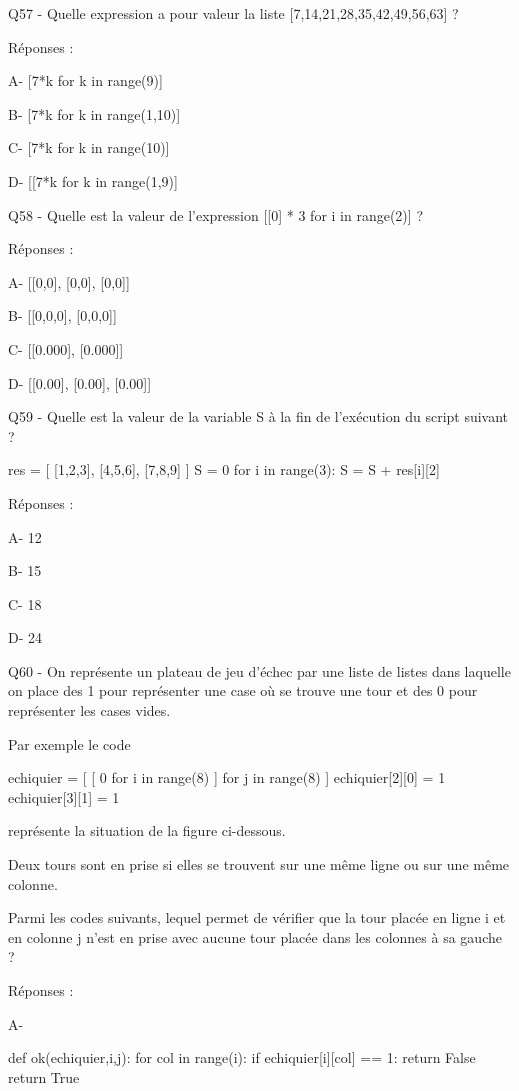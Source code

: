 \documentclass[
]{book}
\begin{document}
Q57 - Quelle expression a pour valeur la liste {[}7,14,21,28,35,42,49,56,63{]} ?

Réponses :

A- {[}7*k for k in range(9){]}

B- {[}7*k for k in range(1,10){]}

C- {[}7*k for k in range(10){]}

D- {[}{[}7*k for k in range(1,9){]}

Q58 - Quelle est la valeur de l'expression {[}{[}0{]} * 3 for i in range(2){]} ?

Réponses :

A- {[}{[}0,0{]}, {[}0,0{]}, {[}0,0{]}{]}

B- {[}{[}0,0,0{]}, {[}0,0,0{]}{]}

C- {[}{[}0.000{]}, {[}0.000{]}{]}

D- {[}{[}0.00{]}, {[}0.00{]}, {[}0.00{]}{]}

Q59 - Quelle est la valeur de la variable S à la fin de l'exécution du script suivant ?

res = {[} {[}1,2,3{]}, {[}4,5,6{]}, {[}7,8,9{]} {]}
S = 0
for i in range(3):
S = S + res{[}i{]}{[}2{]}

Réponses :

A- 12

B- 15

C- 18

D- 24

Q60 - On représente un plateau de jeu d'échec par une liste de listes dans laquelle on place des 1 pour représenter une case où se trouve une tour et des 0 pour représenter les cases vides.

Par exemple le code

echiquier = {[} {[} 0 for i in range(8) {]} for j in range(8) {]}
echiquier{[}2{]}{[}0{]} = 1
echiquier{[}3{]}{[}1{]} = 1

représente la situation de la figure ci-dessous.

Deux tours sont en prise si elles se trouvent sur une même ligne ou sur une même colonne.

Parmi les codes suivants, lequel permet de vérifier que la tour placée en ligne i et en colonne j n'est en prise avec aucune tour placée dans les colonnes à sa gauche ?

Réponses :

A-

def ok(echiquier,i,j):
for col in range(i):
if echiquier{[}i{]}{[}col{]} == 1:
return False
return True
\end{document}
